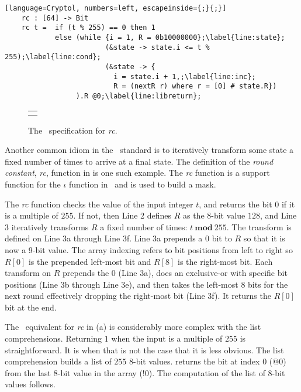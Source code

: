 \newsavebox{\RcCryLib}
\begin{lrbox}{\RcCryLib}
  \begin{lstlisting}[language=Cryptol, numbers=left, escapeinside={;}{;}]
    rc : [64] -> Bit
    rc t =  if (t % 255) == 0 then 1 
            else (while {i = 1, R = 0b10000000};\label{line:state};
                        (&state -> state.i <= t % 255);\label{line:cond};
                        (&state -> {
                          i = state.i + 1,;\label{line:inc};
                          R = (nextR r) where r = [0] # state.R})
                 ).R @0;\label{line:libreturn};
  \end{lstlisting}
\end{lrbox}

\begin{figure}[t]
  \begin{center}
    \begin{tabular}{l}
      \usebox{\fipsRc}
    \end{tabular}
  \end{center}
  \caption{The \fips\ specification for \emph{rc}.}
  \label{fig:rc}
\end{figure}

Another common idiom in the \fips\ standard is to iteratively transform some state a fixed number of times to arrive at a final state.
The definition of the \emph{round constant}, \emph{rc}, function in  is one such example.
The \emph{rc} function is a support function for the $\iota$ function in \keccak\ and is used to build a mask.

The \emph{rc} function checks the value of the input integer $t$, and returns the bit $0$ if it is a multiple of $255$.
If not, then Line 2 defines $R$ as the 8-bit value $128$, and Line 3 iteratively transforms $R$ a fixed number of times: $t\ \mathbf{mod}\ 255$.
The transform is defined on Line 3a through Line 3f.
Line 3a prepends a $0$ bit to $R$ so that it is now a 9-bit value. The array indexing refers to bit positions from left to right so $R[0]$ is the prepended left-most bit and $R[8]$ is the right-most bit. Each transform on $R$ prepends the 0 (Line 3a), does an exclusive-or with specific bit positions (Line 3b through Line 3e), and then takes the left-most 8 bits for the next round effectively dropping the right-most bit (Line 3f).
It returns the $R[0]$ bit at the end.

The \cryptol\ equivalent for \emph{rc} in (a) is considerably more complex with the list comprehensions.
Returning $1$ when the input is a multiple of $255$ is straightforward.
It is when that is not the case that it is less obvious.
The list comprehension builds a list of $255$ 8-bit values.
 returns the bit at index 0 ($@0$) from the last 8-bit value in the array ($!0$).
The computation of the list of 8-bit values follows.


